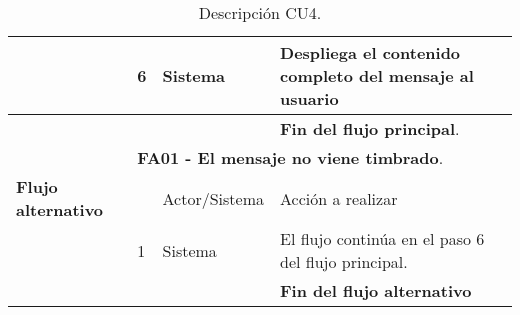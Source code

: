 \documentclass[12pt,oneside,onecolumn,openany]{report}
\begin{document}
\begin{table}[H]
{\begin{tabular}{| p{} | p{} |p{4cm}|p{5cm}|}
     \hline
     & 6 & Sistema & Despliega el contenido completo del mensaje al usuario\\
     \hline
     & & & \textbf{Fin del flujo principal}.\\
     \hline
     & \multicolumn{3}{|l|}{\textbf{FA01 - El mensaje no viene timbrado}.}\\
     \hline
     \textbf{Flujo alternativo} & & Actor/Sistema & Acción a realizar\\
     \hline
     & 1 & Sistema & El flujo continúa en el paso 6 del flujo principal.\\
     \hline
     &  & & \textbf{Fin del flujo alternativo}\\
     
     \end{tabular}
    }
    \caption{Descripción CU4.}
    \label{tabla:CU4}
\end{table}


\pagebreak
\end{document}
